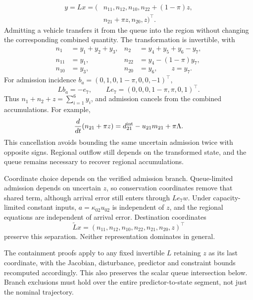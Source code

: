 \documentclass[preprint,12pt]{elsarticle}
\theoremstyle{definition}
\theoremstyle{plain}
\theoremstyle{definition}
\theoremstyle{plain}
\begin{document}
\begin{equation}
\begin{aligned}
y=Lx=(&n_{11},n_{12},n_{10},n_{22}+(1-\pi)z,\\
      &n_{21}+\pi z,n_{20},z)^\top.
\end{aligned}
\label{eq:new-conservation-coordinates}
\end{equation}
Admitting a vehicle transfers it from the queue into the region without
changing the corresponding combined quantity. The transformation is
invertible, with
\begin{equation}
 \begin{aligned}
 n_1&=y_1+y_2+y_3,&n_2&=y_4+y_5+y_6-y_7,\\
 n_{11}&=y_1,&n_{22}&=y_4-(1-\pi)y_7,\\
 n_{10}&=y_3,&n_{20}&=y_6,\qquad z=y_7.
 \end{aligned}
 \label{eq:new-inverse-coordinates}
\end{equation}
For admission incidence $b_a=(0,1,0,1-\pi,0,0,-1)^\top$,
\begin{equation}
 Lb_a=-e_7,
 \qquad Le_7=(0,0,0,1-\pi,\pi,0,1)^\top.
 \label{eq:new-conservation-incidence}
\end{equation}
Thus $n_1+n_2+z=\sum_{i=1}^6y_i$, and admission cancels from the
combined accumulations. For example,
\[
\frac{d}{dt}(n_{21}+\pi z)
=d_{21}^{\rm int}-u_{21}m_{21}+\pi\Lambda.
\]
This cancellation avoids bounding the same uncertain admission twice
with opposite signs. Regional outflow still depends on the transformed
state, and the queue remains necessary to recover regional accumulations.

Coordinate choice depends on the verified admission branch. Queue-limited
admission depends on uncertain $z$, so conservation coordinates remove
that shared term, although arrival error still enters through $Le_7w$.
Under capacity-limited constant inputs, $a=\kappa_{02}u_{02}$ is independent
of $z$, and the regional equations are independent of arrival error.
Destination coordinates
\[
\widetilde Lx=(n_{11},n_{12},n_{10},n_{22},n_{21},n_{20},z)^\top
\]
preserve this separation. Neither representation dominates in general.

The containment proofs apply to any fixed invertible $L$ retaining $z$
as its last coordinate, with the Jacobian, disturbance, predictor and
constraint bounds recomputed accordingly. This also preserves the scalar
queue intersection below. Branch exclusions must hold over the entire
predictor-to-state segment, not just the nominal trajectory.
\end{document}
